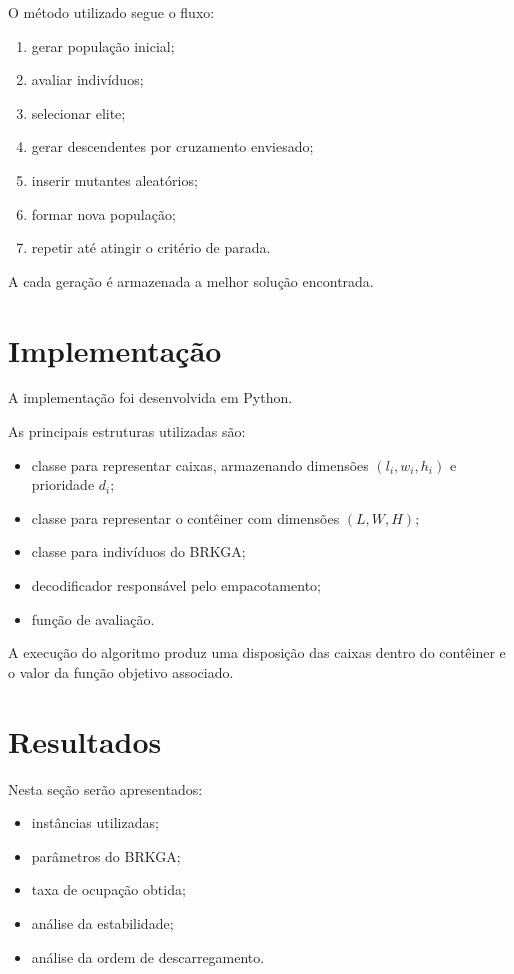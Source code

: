 \documentclass[12pt]{article}
\begin{document}
O método utilizado segue o fluxo:

\begin{enumerate}
\item gerar população inicial;
\item avaliar indivíduos;
\item selecionar elite;
\item gerar descendentes por cruzamento enviesado;
\item inserir mutantes aleatórios;
\item formar nova população;
\item repetir até atingir o critério de parada.
\end{enumerate}

A cada geração é armazenada a melhor solução encontrada.

\section{Implementação}

A implementação foi desenvolvida em Python.

As principais estruturas utilizadas são:

\begin{itemize}
\item classe para representar caixas, armazenando dimensões $(l_i, w_i, h_i)$ e prioridade $d_i$;
\item classe para representar o contêiner com dimensões $(L, W, H)$;
\item classe para indivíduos do BRKGA;
\item decodificador responsável pelo empacotamento;
\item função de avaliação.
\end{itemize}

A execução do algoritmo produz uma disposição das caixas dentro do contêiner e o valor da função objetivo associado.

\section{Resultados}

Nesta seção serão apresentados:

\begin{itemize}
\item instâncias utilizadas;
\item parâmetros do BRKGA;
\item taxa de ocupação obtida;
\item análise da estabilidade;
\item análise da ordem de descarregamento.
\end{itemize}
\end{document}
